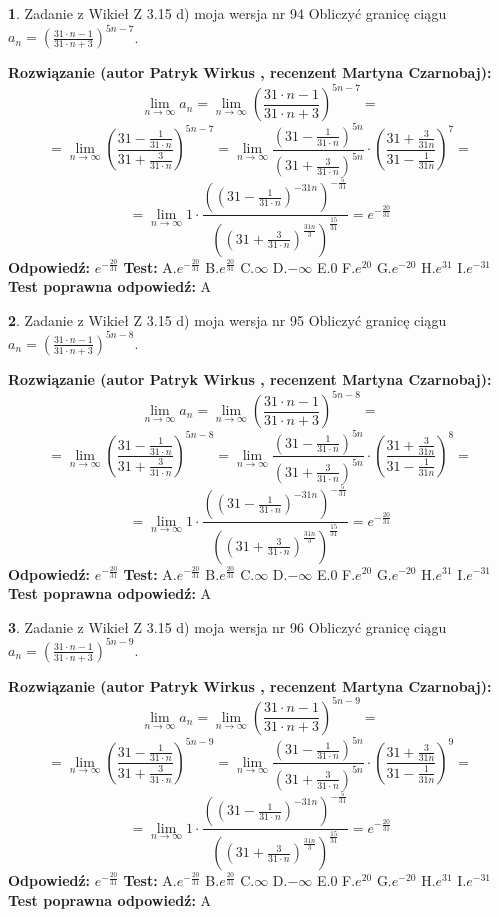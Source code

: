 \documentclass[12pt, a4paper]{article}
\theoremstyle{definition} %
\newtheorem{zad}{}
\newcommand{\zadStart}[1]{\begin{zad}#1\newline}
\newcommand{\zadStop}{\end{zad}}
\newcommand{\rozwStart}[2]{\noindent \textbf{Rozwiązanie (autor #1 , recenzent #2): }\newline}
\newcommand{\rozwStop}{\newline}
\newcommand{\odpStart}{\noindent \textbf{Odpowiedź:}\newline}
\newcommand{\odpStop}{\newline}
\newcommand{\testStart}{\noindent \textbf{Test:}\newline}
\newcommand{\testStop}{\newline}
\newcommand{\kluczStart}{\noindent \textbf{Test poprawna odpowiedź:}\newline}
\newcommand{\kluczStop}{\newline}
\begin{document}
\zadStart{Zadanie z Wikieł Z 3.15 d) moja wersja nr 94}
Obliczyć granicę ciągu $a_{n}=(\frac{31\cdot n - 1}{31 \cdot n + 3})^{5n-7}$.
\zadStop
\rozwStart{Patryk Wirkus}{Martyna Czarnobaj}
$$\lim\limits_{n\to\infty} a_{n} = \lim\limits_{n\to\infty}(\frac{31\cdot n - 1}{31 \cdot n + 3})^{5n-7}=$$
$$=\lim\limits_{n\to\infty}(\frac{31 - \frac{1}{31\cdot n}}{31 + \frac{3}{31 \cdot n}})^{5n-7}=\lim\limits_{n\to\infty}\frac{(31 - \frac{1}{31\cdot n})^{5n}}{(31 + \frac{3}{31\cdot n})^{5n}} \cdot (\frac{31+\frac{3}{31n}}{31-\frac{1}{31n}})^{7}=$$
$$=\lim\limits_{n\to\infty} 1 \cdot \frac{((31-\frac{1}{31 \cdot n})^{-31n})^{-\frac{5}{31}}}{((31+\frac{3}{31 \cdot n})^{\frac{31n}{3}})^{\frac{15}{31}}} =e^{-\frac{20}{31}}$$
\rozwStop
\odpStart
$e^{-\frac{20}{31}}$
\odpStop
\testStart
A.$ e^{-\frac{20}{31}}$
B.$ e^{\frac{20}{31}}$
C.$\infty$
D.$-\infty$
E.$0$
F.$e^{20}$
G.$e^{-20}$
H.$e^{31}$
I.$e^{-31}$
\testStop
\kluczStart
A
\kluczStop



\zadStart{Zadanie z Wikieł Z 3.15 d) moja wersja nr 95}
Obliczyć granicę ciągu $a_{n}=(\frac{31\cdot n - 1}{31 \cdot n + 3})^{5n-8}$.
\zadStop
\rozwStart{Patryk Wirkus}{Martyna Czarnobaj}
$$\lim\limits_{n\to\infty} a_{n} = \lim\limits_{n\to\infty}(\frac{31\cdot n - 1}{31 \cdot n + 3})^{5n-8}=$$
$$=\lim\limits_{n\to\infty}(\frac{31 - \frac{1}{31\cdot n}}{31 + \frac{3}{31 \cdot n}})^{5n-8}=\lim\limits_{n\to\infty}\frac{(31 - \frac{1}{31\cdot n})^{5n}}{(31 + \frac{3}{31\cdot n})^{5n}} \cdot (\frac{31+\frac{3}{31n}}{31-\frac{1}{31n}})^{8}=$$
$$=\lim\limits_{n\to\infty} 1 \cdot \frac{((31-\frac{1}{31 \cdot n})^{-31n})^{-\frac{5}{31}}}{((31+\frac{3}{31 \cdot n})^{\frac{31n}{3}})^{\frac{15}{31}}} =e^{-\frac{20}{31}}$$
\rozwStop
\odpStart
$e^{-\frac{20}{31}}$
\odpStop
\testStart
A.$ e^{-\frac{20}{31}}$
B.$ e^{\frac{20}{31}}$
C.$\infty$
D.$-\infty$
E.$0$
F.$e^{20}$
G.$e^{-20}$
H.$e^{31}$
I.$e^{-31}$
\testStop
\kluczStart
A
\kluczStop



\zadStart{Zadanie z Wikieł Z 3.15 d) moja wersja nr 96}
Obliczyć granicę ciągu $a_{n}=(\frac{31\cdot n - 1}{31 \cdot n + 3})^{5n-9}$.
\zadStop
\rozwStart{Patryk Wirkus}{Martyna Czarnobaj}
$$\lim\limits_{n\to\infty} a_{n} = \lim\limits_{n\to\infty}(\frac{31\cdot n - 1}{31 \cdot n + 3})^{5n-9}=$$
$$=\lim\limits_{n\to\infty}(\frac{31 - \frac{1}{31\cdot n}}{31 + \frac{3}{31 \cdot n}})^{5n-9}=\lim\limits_{n\to\infty}\frac{(31 - \frac{1}{31\cdot n})^{5n}}{(31 + \frac{3}{31\cdot n})^{5n}} \cdot (\frac{31+\frac{3}{31n}}{31-\frac{1}{31n}})^{9}=$$
$$=\lim\limits_{n\to\infty} 1 \cdot \frac{((31-\frac{1}{31 \cdot n})^{-31n})^{-\frac{5}{31}}}{((31+\frac{3}{31 \cdot n})^{\frac{31n}{3}})^{\frac{15}{31}}} =e^{-\frac{20}{31}}$$
\rozwStop
\odpStart
$e^{-\frac{20}{31}}$
\odpStop
\testStart
A.$ e^{-\frac{20}{31}}$
B.$ e^{\frac{20}{31}}$
C.$\infty$
D.$-\infty$
E.$0$
F.$e^{20}$
G.$e^{-20}$
H.$e^{31}$
I.$e^{-31}$
\testStop
\kluczStart
A
\kluczStop
\end{document}
